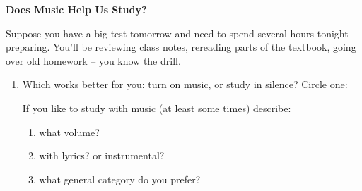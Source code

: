 \def\theTopic{ Music for Studying }
\def\dayNum{11}

\begin{center}
\vspace*{.1in}
{\bf {\large Does Music Help Us Study?}}\\
\end{center}
\vspace{-.1in}


Suppose you have a big test tomorrow and need to spend several hours
tonight preparing.  You'll be reviewing class notes, rereading  parts
of the textbook, going over old homework -- you know the drill.
\begin{enumerate}
\item  Which works better for you: turn on music, or study in silence? 
  Circle one:
  If you like to study with music (at least some times) describe:
  \begin{enumerate}
  \item what volume?\\
  \item with lyrics? or instrumental?\\
  \item what general category do you prefer?\\
  \end{enumerate}


\end{enumerate}
